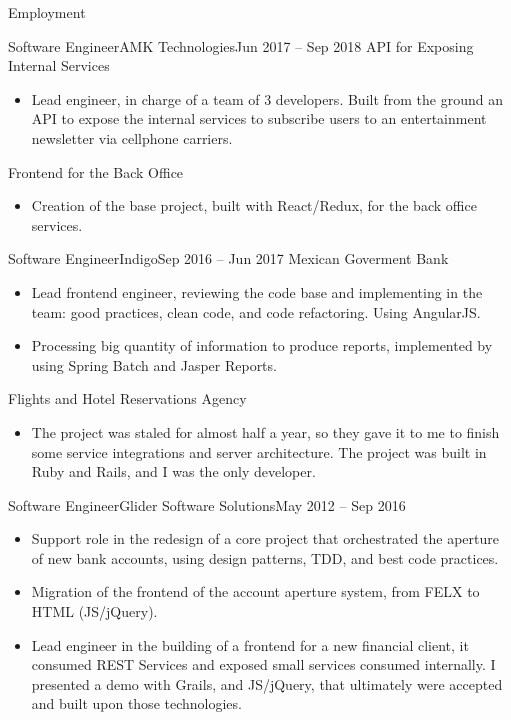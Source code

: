 \documentclass[calibri]{../macdowell-cv/mcdowellcv}
\begin{document}
	\makeheader
	
	\begin{cvsection}{Employment}
		\begin{cvsubsection}{Software Engineer}{AMK Technologies}{Jun 2017 -- Sep 2018}
			API for Exposing Internal Services
			\begin{itemize}
				\item Lead engineer, in charge of a team of 3 developers. Built from the ground an API to expose the internal services to subscribe users to an entertainment newsletter via cellphone carriers.
			\end{itemize}
			Frontend for the Back Office
			\begin{itemize}
				\item Creation of the base project, built with React/Redux, for the back office services.
			\end{itemize}
		\end{cvsubsection}

		\begin{cvsubsection}{Software Engineer}{Indigo}{Sep 2016 -- Jun 2017}		
			Mexican Goverment Bank
			\begin{itemize}
				\item Lead frontend engineer, reviewing the code base and implementing in the team: good practices, clean code, and code refactoring. Using AngularJS.
				\item Processing big quantity of information to produce reports, implemented by using Spring Batch and Jasper Reports.
			\end{itemize}
			Flights and Hotel Reservations Agency
			\begin{itemize}
				\item The project was staled for almost half a year, so they gave it to me to finish some service integrations and server architecture. The project was built in Ruby and Rails, and I was the only developer.
			\end{itemize}
		\end{cvsubsection}
		
		\begin{cvsubsection}{Software Engineer}{Glider Software Solutions}{May 2012 -- Sep 2016}	
			\begin{itemize}
				\item Support role in the redesign of a core project that orchestrated the aperture of new bank accounts, using design patterns, TDD, and best code practices.
				\item Migration of the frontend of the account aperture system, from FELX to HTML (JS/jQuery).
				\item Lead engineer in the building of a frontend for a new financial client, it consumed REST Services and exposed small services consumed internally. I presented a demo with Grails, and JS/jQuery, that ultimately were accepted and built upon those technologies.
			\end{itemize}
		\end{cvsubsection}
		

\end{cvsection}
\end{document}
